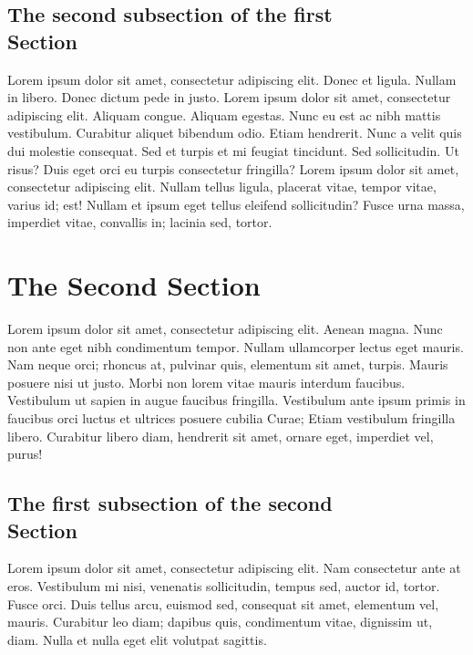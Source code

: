 \documentclass[a4paper,10pt]{article}
\begin{document}
\begin{multicols}{2}
\subsection{The second subsection of the first \\ Section}

Lorem ipsum dolor sit amet, consectetur adipiscing elit. Donec et ligula. Nullam
in libero. Donec dictum pede in justo. Lorem ipsum dolor sit amet, consectetur
adipiscing elit. Aliquam congue. Aliquam egestas. Nunc eu est ac nibh mattis
vestibulum. Curabitur aliquet bibendum odio. Etiam hendrerit. Nunc a velit quis
dui molestie consequat. Sed et turpis et mi feugiat tincidunt. Sed sollicitudin.
Ut risus? Duis eget orci eu turpis consectetur fringilla? Lorem ipsum dolor sit
amet, consectetur adipiscing elit. Nullam tellus ligula, placerat vitae, tempor
vitae, varius id; est! Nullam et ipsum eget tellus eleifend sollicitudin? Fusce
urna massa, imperdiet vitae, convallis in; lacinia sed, tortor.



\section{The Second Section}

Lorem ipsum dolor sit amet, consectetur adipiscing elit.  Aenean magna. Nunc non
ante eget nibh condimentum tempor. Nullam ullamcorper lectus eget mauris. Nam
neque orci; rhoncus at, pulvinar quis, elementum sit amet, turpis. Mauris
posuere nisi ut justo. Morbi non lorem vitae mauris interdum faucibus.
Vestibulum ut sapien in augue faucibus fringilla. Vestibulum ante ipsum primis
in faucibus orci luctus et ultrices posuere cubilia Curae; Etiam vestibulum
fringilla libero. Curabitur libero diam, hendrerit sit amet, ornare eget,
imperdiet vel, purus!


\subsection{The first subsection of the second \\ Section}

Lorem ipsum dolor sit amet, consectetur adipiscing elit. Nam consectetur ante at
eros. Vestibulum mi nisi, venenatis sollicitudin, tempus sed, auctor id, tortor.
Fusce orci. Duis tellus arcu, euismod sed, consequat sit amet, elementum vel,
mauris. Curabitur leo diam; dapibus quis, condimentum vitae, dignissim ut, diam.
Nulla et nulla eget elit volutpat sagittis.


\end{multicols}
\end{document}
